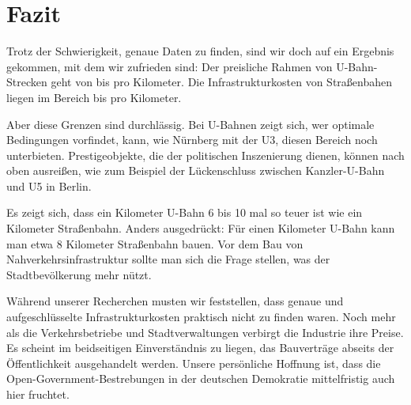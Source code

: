 \chapter{Fazit}




Trotz der Schwierigkeit, genaue Daten zu finden, sind wir doch auf ein Ergebnis gekommen, mit dem wir zufrieden sind: Der preisliche Rahmen von U-Bahn-Strecken geht von  bis  pro Kilometer. Die Infrastrukturkosten von Straßenbahen liegen im Bereich  bis  pro Kilometer.

Aber diese Grenzen sind durchlässig. Bei U-Bahnen zeigt sich, wer optimale Bedingungen vorfindet, kann, wie Nürnberg mit der U3, diesen Bereich noch unterbieten. Prestigeobjekte, die der politischen Inszenierung dienen, können nach oben ausreißen, wie zum Beispiel der Lückenschluss zwischen Kanzler-U-Bahn und U5 in Berlin. 

Es zeigt sich, dass ein Kilometer U-Bahn 6 bis 10 mal so teuer ist wie ein Kilometer Straßenbahn. Anders ausgedrückt: Für einen Kilometer U-Bahn kann man etwa 8 Kilometer Straßenbahn bauen. Vor dem Bau von Nahverkehrsinfrastruktur sollte man sich die Frage stellen, was der Stadtbevölkerung mehr nützt. 

Während unserer Recherchen musten wir feststellen, dass genaue und aufgeschlüsselte Infrastrukturkosten praktisch nicht zu finden waren. Noch mehr als die Verkehrsbetriebe und Stadtverwaltungen verbirgt die Industrie ihre Preise. Es scheint im beidseitigen Einverständnis zu liegen, das Bauverträge abseits der Öffentlichkeit ausgehandelt werden. Unsere persönliche Hoffnung ist, dass die Open-Government-Bestrebungen in der deutschen Demokratie mittelfristig auch hier fruchtet. 

